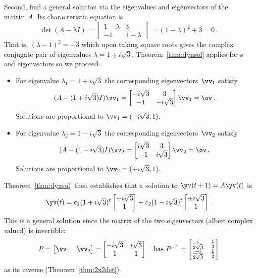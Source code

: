 \begin{example}
\begin{solution}
Second, find a general solution via the eigenvalues and eigenvectors of the matrix~\(A\).  
Its characteristic equation is 
\begin{equation*}
\det(A-\lambda I)=\begin{vmatrix} 1-\lambda&3\\-1&1-\lambda \end{vmatrix}
=(1-\lambda)^2+3=0\,.
\end{equation*}
That is, \((\lambda-1)^2=-3\) which upon taking square roots gives the complex conjugate pair of eigenvalues \(\lambda=1\pm i\sqrt3\).
Theorem~\ref{thm:dynsol} applies for s and eigenvectors so we proceed.
\begin{itemize}
\item For eigenvalue \(\lambda_1=1+i\sqrt3\) the corresponding eigenvectors~\(\vv_1\) satisfy
\begin{equation*}
(A-(1+i\sqrt3)I)\vv_1=\begin{bmatrix} -i\sqrt3&3\\-1&-i\sqrt3 \end{bmatrix}\vv_1=\ov\,.
\end{equation*}
Solutions are proportional to \(\vv_1=(-i\sqrt3,1)\).

\item For eigenvalue \(\lambda_2=1-i\sqrt3\) the corresponding eigenvectors~\(\vv_2\) satisfy
\begin{equation*}
(A-(1-i\sqrt3)I)\vv_2=\begin{bmatrix} i\sqrt3&3\\-1&i\sqrt3 \end{bmatrix}\vv_2=\ov\,.
\end{equation*}
Solutions are proportional to \(\vv_2=(+i\sqrt3,1)\).
\end{itemize}
Theorem~\ref{thm:dynsol} then establishes that a solution to \(\yv(t+1)=A\yv(t)\) is
\begin{equation*}
\yv(t)=c_1(1+i\sqrt3)^t\begin{bmatrix} -i\sqrt3\\1 \end{bmatrix}
+c_2(1-i\sqrt3)^t\begin{bmatrix} +i\sqrt3\\1 \end{bmatrix}.
\end{equation*}
This is a general solution since the matrix of the two eigenvectors (albeit complex valued) is invertible:
\begin{equation*}
P=\begin{bmatrix} \vv_1&\vv_2 \end{bmatrix}
=\begin{bmatrix} -i\sqrt3&i\sqrt3\\1&1 \end{bmatrix}
\quad\text{has }
P^{-1}=\begin{bmatrix} \frac i{2\sqrt3}&\frac12\\\frac{-i}{2\sqrt3}&\frac12 \end{bmatrix}
\end{equation*}
as its inverse (Theorem~\ref{thm:2x2det}).


\end{solution}
\end{example}
